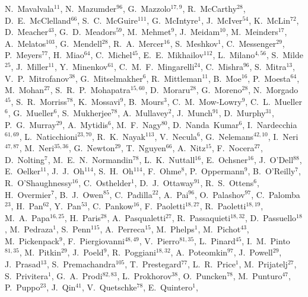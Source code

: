 \documentclass[12pt]{iopart}
\begin{document}
{N.~Mavalvala$^{11}$, 
N.~Mazumder$^{96}$, 
G.~Mazzolo$^{17,9}$, 
R.~McCarthy$^{28}$, 
D.~E.~McClelland$^{66}$, 
S.~C.~McGuire$^{111}$, 
G.~McIntyre$^{1}$, 
J.~McIver$^{54}$, 
K.~McLin$^{72}$, 
D.~Meacher$^{43}$, 
G.~D.~Meadors$^{59}$, 
M.~Mehmet$^{9}$, 
J.~Meidam$^{10}$, 
M.~Meinders$^{17}$, 
A.~Melatos$^{103}$, 
G.~Mendell$^{28}$, 
R.~A.~Mercer$^{16}$, 
S.~Meshkov$^{1}$, 
C.~Messenger$^{29}$, 
P.~Meyers$^{77}$, 
H.~Miao$^{64}$, 
C.~Michel$^{45}$, 
E.~E.~Mikhailov$^{112}$, 
L.~Milano$^{4,56}$, 
S.~Milde$^{25}$, 
J.~Miller$^{11}$, 
Y.~Minenkov$^{61}$, 
C.~M.~F.~Mingarelli$^{24}$, 
C.~Mishra$^{96}$, 
S.~Mitra$^{13}$, 
V.~P.~Mitrofanov$^{38}$, 
G.~Mitselmakher$^{6}$, 
R.~Mittleman$^{11}$, 
B.~Moe$^{16}$, 
P.~Moesta$^{64}$, 
M.~Mohan$^{27}$, 
S.~R.~P.~Mohapatra$^{15,60}$, 
D.~Moraru$^{28}$, 
G.~Moreno$^{28}$, 
N.~Morgado$^{45}$, 
S.~R.~Morriss$^{78}$, 
K.~Mossavi$^{9}$, 
B.~Mours$^{3}$, 
C.~M.~Mow-Lowry$^{9}$, 
C.~L.~Mueller$^{6}$, 
G.~Mueller$^{6}$, 
S.~Mukherjee$^{78}$, 
A.~Mullavey$^{2}$, 
J.~Munch$^{91}$, 
D.~Murphy$^{31}$, 
P.~G.~Murray$^{29}$, 
A.~Mytidis$^{6}$, 
M.~F.~Nagy$^{80}$, 
D.~Nanda~Kumar$^{6}$, 
I.~Nardecchia$^{61,69}$, 
L.~Naticchioni$^{23,70}$, 
R.~K.~Nayak$^{113}$, 
V.~Necula$^{6}$, 
G.~Nelemans$^{42,10}$, 
I.~Neri$^{47,87}$, 
M.~Neri$^{35,36}$, 
G.~Newton$^{29}$, 
T.~Nguyen$^{66}$, 
A.~Nitz$^{15}$, 
F.~Nocera$^{27}$, 
D.~Nolting$^{7}$, 
M.~E.~N.~Normandin$^{78}$, 
L.~K.~Nuttall$^{16}$, 
E.~Ochsner$^{16}$, 
J.~O'Dell$^{88}$, 
E.~Oelker$^{11}$, 
J.~J.~Oh$^{114}$, 
S.~H.~Oh$^{114}$, 
F.~Ohme$^{8}$, 
P.~Oppermann$^{9}$, 
B.~O'Reilly$^{7}$, 
R.~O'Shaughnessy$^{16}$, 
C.~Osthelder$^{1}$, 
D.~J.~Ottaway$^{91}$, 
R.~S.~Ottens$^{6}$, 
H.~Overmier$^{7}$, 
B.~J.~Owen$^{85}$, 
C.~Padilla$^{22}$, 
A.~Pai$^{96}$, 
O.~Palashov$^{97}$, 
C.~Palomba$^{23}$, 
H.~Pan$^{62}$, 
Y.~Pan$^{53}$, 
C.~Pankow$^{16}$, 
F.~Paoletti$^{18,27}$, 
R.~Paoletti$^{18,19}$, 
M.~A.~Papa$^{16,25}$, 
H.~Paris$^{28}$, 
A.~Pasqualetti$^{27}$, 
R.~Passaquieti$^{18,32}$, 
D.~Passuello$^{18}$, 
M.~Pedraza$^{1}$, 
S.~Penn$^{115}$, 
A.~Perreca$^{15}$, 
M.~Phelps$^{1}$, 
M.~Pichot$^{43}$, 
M.~Pickenpack$^{9}$, 
F.~Piergiovanni$^{48,49}$, 
V.~Pierro$^{81,35}$, 
L.~Pinard$^{45}$, 
I.~M.~Pinto$^{81,35}$, 
M.~Pitkin$^{29}$, 
J.~Poeld$^{9}$, 
R.~Poggiani$^{18,32}$, 
A.~Poteomkin$^{97}$, 
J.~Powell$^{29}$, 
J.~Prasad$^{13}$, 
S.~Premachandra$^{105}$, 
T.~Prestegard$^{77}$, 
L.~R.~Price$^{1}$,
M.~Prijatelj$^{27}$, 
S.~Privitera$^{1}$, 
G.~A.~Prodi$^{82,83}$, 
L.~Prokhorov$^{38}$, 
O.~Puncken$^{78}$, 
M.~Punturo$^{47}$, 
P.~Puppo$^{23}$, 
J.~Qin$^{41}$, 
V.~Quetschke$^{78}$, 
E.~Quintero$^{1}$, 
}
\end{document}
